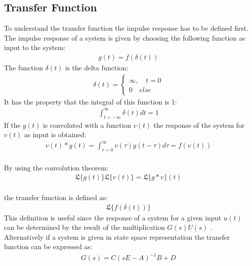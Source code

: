 \subsection{Transfer Function}
To understand the transfer function the impulse response has to be defined first.
The impulse response of a system is given by choosing the following function as input to the system:
\begin{gather}
g(t) = f(\delta(t))
\end{gather}
The function \(\delta(t)\) is the delta function:
\begin{gather}
\delta(t) = \begin{cases}
\infty, \quad t = 0 \\
0 \quad else
\end{cases}
\end{gather}
It has the property that the integral of this function is 1:
\begin{gather}
\int_{t = -\infty}^{\infty} \delta(t) dt = 1
\end{gather}
If the \(g(t)\) is convoluted with a function \(v(t)\) the response of the system for \(v(t)\) as input is obtained:
\begin{gather}
v(t)*g(t) = \int_{\tau = 0}^{\infty} v(\tau)g(t-\tau)d\tau = f(v(t))
\end{gather}
\cite{DouglasBb} \\
By using the convolution theorem:
\begin{gather}
\mathfrak{L}\{g(t)\}\mathfrak{L}\{v(t)\} = \mathfrak{L}\{g*v\}(t)
\end{gather}
\cite{ABELL2018399}\\
the transfer function is defined as:
\begin{gather}
\mathfrak{L}\{f(\delta(t))\}
\end{gather}
This definition is useful since the response of a system for a given input \(u(t)\) can be determined by the result of the multiplication \(G(s)U(s)\) \cite{DouglasBb}.
Alternatively if a system is given in state space representation the transfer function can be expressed as:
\begin{gather}
G(s) = C(sE-A)^{-1}B+D \label{tf-from-ss}
\end{gather}
\cite{BennerGrivet}

